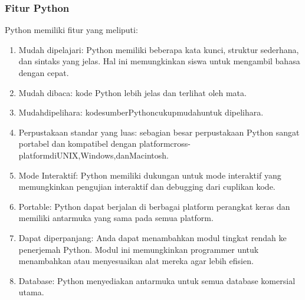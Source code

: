 \subsubsection{Fitur Python}
Python memiliki fitur yang meliputi:
	\begin{enumerate}
		\item Mudah dipelajari: Python memiliki beberapa kata kunci, struktur sederhana, dan sintaks yang jelas. Hal ini memungkinkan siswa untuk mengambil bahasa dengan cepat.
		\item Mudah dibaca: kode Python lebih jelas dan terlihat oleh mata.
		\item Mudahdipelihara: kodesumberPythoncukupmudahuntuk dipelihara.
		\item Perpustakaan standar yang luas: sebagian besar perpustakaan Python sangat portabel dan kompatibel dengan platformcross-platformdiUNIX,Windows,danMacintosh. 
		\item Mode Interaktif: Python memiliki dukungan untuk mode interaktif yang memungkinkan pengujian interaktif dan debugging dari cuplikan kode.
		\item Portable: Python dapat berjalan di berbagai platform perangkat keras dan memiliki antarmuka yang sama pada semua platform.
		\item Dapat diperpanjang: Anda dapat menambahkan modul tingkat rendah ke penerjemah Python. Modul ini memungkinkan programmer untuk menambahkan atau menyesuaikan alat mereka agar lebih eﬁsien.
		\item Database: Python menyediakan antarmuka untuk semua database komersial utama. 
	\end{enumerate}

